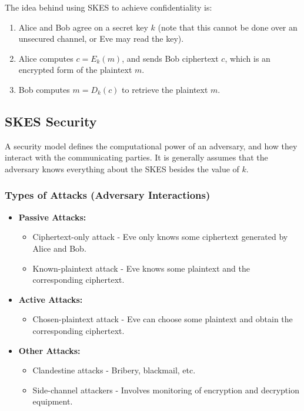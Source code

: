 \documentclass[12pt,titlepage]{article}
\begin{document}
      The idea behind using SKES to achieve confidentiality is:
        \begin{enumerate}
          \item Alice and Bob agree on a secret key $k$ (note that this cannot be done over an unsecured
            channel, or Eve may read the key).
          \item Alice computes $c = E_k(m)$, and sends Bob ciphertext $c$, which is an encrypted form of the plaintext $m$.
          \item Bob computes $m = D_k(c)$ to retrieve the plaintext $m$.
        \end{enumerate}

    \subsection{SKES Security}
      A security model defines the computational power of an adversary, and how they interact with the communicating parties.
      It is generally assumes that the adversary knows everything about the SKES besides the value of $k$.

      \subsubsection{Types of Attacks (Adversary Interactions)}
        \begin{itemize}
          \item \textbf{Passive Attacks:}
            \begin{itemize}
              \item Ciphertext-only attack - Eve only knows some ciphertext generated by Alice and Bob.
              \item Known-plaintext attack - Eve knows some plaintext and the corresponding ciphertext.
            \end{itemize}
          \item \textbf{Active Attacks:}
            \begin{itemize}
              \item Chosen-plaintext attack - Eve can choose some plaintext and obtain the corresponding ciphertext.
            \end{itemize}
          \item \textbf{Other Attacks:}
            \begin{itemize}
              \item Clandestine attacks - Bribery, blackmail, etc.
              \item Side-channel attackers - Involves monitoring of encryption and decryption equipment.
            \end{itemize}
        \end{itemize}
\end{document}
